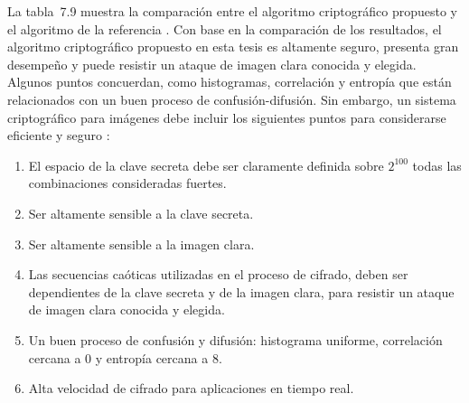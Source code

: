 La tabla~7.9 muestra la comparación entre el algoritmo criptográfico propuesto y el algoritmo de la referencia \cite{LEtAl_2012a}. Con base en la comparación de los resultados, el algoritmo criptográfico propuesto en esta tesis es altamente seguro, presenta gran desempeño y puede resistir un ataque de imagen clara conocida y elegida. Algunos puntos concuerdan, como histogramas, correlación y entropía que están relacionados con un buen proceso de confusión-difusión. Sin embargo, un sistema criptográfico para imágenes debe incluir los siguientes puntos para considerarse eficiente y seguro \cite{AyL_2006}:
\begin{enumerate}
\item El espacio de la clave secreta debe ser claramente definida sobre $2^{100}$ todas las combinaciones consideradas fuertes.
\item Ser altamente sensible a la clave secreta.
\item Ser altamente sensible a la imagen clara.
\item Las secuencias caóticas utilizadas en el proceso de cifrado, deben ser dependientes de la clave secreta y de la imagen clara, para resistir un ataque de imagen clara conocida y elegida.
\item Un buen proceso de confusión y difusión: histograma uniforme, correlación cercana a 0 y entropía cercana a 8.
\item Alta velocidad de cifrado para aplicaciones en tiempo real. \\
\end{enumerate}
 
